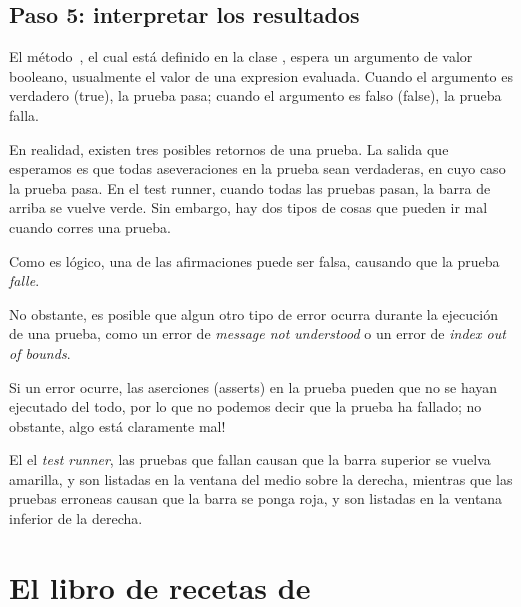 \documentclass[a4paper,10pt,twoside]{book}
\begin{document}

\subsection{Paso 5: interpretar los resultados}

El m\'etodo \,, el cual est\'a definido en la clase
, espera un argumento de valor booleano, usualmente el valor de 
una expresion evaluada. Cuando el argumento es verdadero (true), la prueba pasa;
cuando el argumento es falso (false), la prueba falla.

En realidad, existen tres posibles retornos de una prueba.
La salida que esperamos es que todas aseveraciones en la prueba sean verdaderas, en cuyo caso la prueba pasa.
En el test runner, cuando todas las pruebas pasan, la barra de arriba se vuelve verde.
Sin embargo, hay dos tipos de cosas que pueden ir mal cuando corres una prueba.

Como es l\'ogico, una de las afirmaciones puede ser falsa, causando que la prueba \emph{falle}. 

No obstante, es posible que algun otro tipo de error ocurra durante la ejecuci\'on de una prueba,
como un error de \emph{message not understood} o un error de \emph{index out of bounds}.

Si un error ocurre, las aserciones (asserts) en la prueba pueden que no se hayan ejecutado del todo, 
por lo que no podemos decir que la prueba ha fallado; no obstante, algo est\'a claramente mal!

El el \emph{test runner}, las pruebas que fallan causan que la barra superior se vuelva amarilla, 
y son listadas en la ventana del medio sobre la derecha, mientras que
las pruebas erroneas causan que la barra se ponga roja, y son listadas en la ventana inferior de la derecha.


\section{El libro de recetas de \SUnit }
\end{document}
